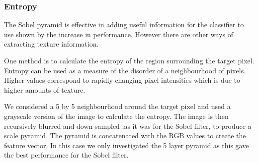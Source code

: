 \documentclass[12pt]{IIBproject}
\begin{document}
\subsubsection{Entropy}
The Sobel pyramid is effective in adding useful information for the classifier to use shown by the increase in performance. However there are other ways of extracting texture information.
 
One method is to calculate the entropy of the region surrounding the target pixel. Entropy can be used as a measure of the disorder of a neighbourhood of pixels\cite{jernigan1984entropy}. Higher values correspond to rapidly changing pixel intensities which is due to higher amounts of texture. 

We considered a 5 by 5 neighbourhood around the target pixel and used a grayscale version of the image to calculate the entropy. The image is then recursively blurred and down-sampled ,as it was for the Sobel filter, to produce a scale pyramid. The pyramid is concatenated with the RGB values to create the feature vector. In this case we only investigated the 5 layer pyramid as this gave the best performance for the Sobel filter. 
\end{document}
